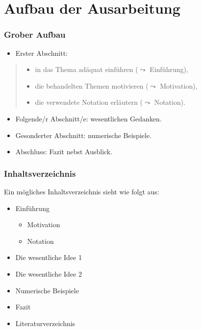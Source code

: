 \documentclass[10pt]{beamer} %
\begin{document}
\section{Aufbau der Ausarbeitung}
\begin{frame}
  \frametitle{Grober Aufbau}

  \begin{itemize}
  \item Erster Abschnitt:
  \end{itemize}
  \begin{quote}
  \begin{itemize}
  \item in das Thema adäquat einführen ($\leadsto$ Einführung),
  \item die behandelten Themen motivieren ($\leadsto$ Motivation),
  \item die verwendete Notation erläutern ($\leadsto$ Notation).
  \end{itemize}
  \end{quote}
  \begin{itemize}
  \item Folgende/r Abschnitt/e: wesentlichen Gedanken.
  \item Gesonderter Abschnitt: numerische Beispiele.
  \item Abschluss: Fazit nebst Ausblick.
  \end{itemize}

\end{frame}
\begin{frame}
  \frametitle{Inhaltsverzeichnis}

  Ein mögliches Inhaltsverzeichnis sieht wie folgt aus:

  \begin{itemize}
  \item Einführung
    \begin{itemize}
    \item Motivation
    \item Notation
    \end{itemize}
  \item Die wesentliche Idee 1
  \item Die wesentliche Idee 2
  \item Numerische Beispiele
  \item Fazit
  \item Literaturverzeichnis
  \end{itemize}

\end{frame}
\end{document}
